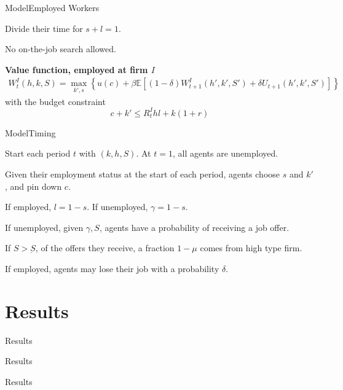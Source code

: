 \documentclass[notes, 10pt,t]{beamer}
\newenvironment{wideitemize}{\itemize\addtolength{\itemsep}{10pt}}{\enditemize}
\newenvironment{wideenumerate}{\enumerate\addtolength{\itemsep}{10pt}}{\endenumerate}
\begin{document}
	\begin{frame}{Model}{Employed Workers}
		\begin{wideitemize}
			\item Divide their time for $ s + l = 1 $.
			\item No on-the-job search allowed.
		\end{wideitemize}

		\vspace{0.5cm}
		
		\textbf{Value function, employed at firm $I$}
		\begin{align*}
			W^I_t(h,k,S) =  \max_{k',s} \left\{ u(c) + \beta\mathbb{E}\left[ (1 - \delta) W^I_{t+1}(h',k',S')
			+ \delta  U_{t+1}(h',k',S')  \right] \right\}
		\end{align*}
		with the budget constraint \[   c + k' \leq R^I_t h l + k(1 +r) \]
	\end{frame}

	\begin{frame}{Model}{Timing}
		\begin{wideenumerate}
			\item Start each period $t$ with $(k,h,S)$. At $t=1$, all agents are unemployed.
			\item Given their employment status at the start of each period, agents choose $s$ and $k'$, and pin down $c$.
			\item If employed, $l = 1 - s$. If unemployed, $\gamma = 1 - s$.
			\item If unemployed, given $\gamma, S$, agents have a probability of receiving a job offer.
			\item If $S > \underbar{S}$, of the offers they receive, a fraction $1 - \mu$ comes from high type firm.
			\item If employed, agents may lose their job with a probability $\delta$.
		\end{wideenumerate}
	\end{frame}
	
	\section{Results}
	\begin{frame}{Results}{}
		
	\end{frame}

	\begin{frame}{Results}{}
		
	\end{frame}


	\begin{frame}{Results}{}
		
	\end{frame}
\end{document}
